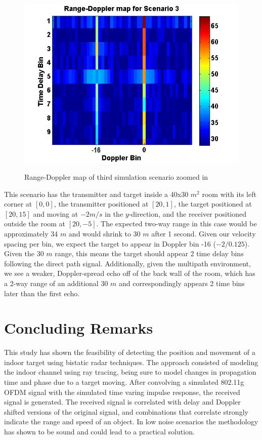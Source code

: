 \documentclass[article,11pt,onecolumn,final]{IEEEtran}
\begin{document}
\begin{figure}[H]
	\caption{Range-Doppler map of third simulation scenario zoomed in}
	\centering
	\includegraphics[width=400pt]{figures/rdm3zoom.png}
	\label{fig:rdm3zoom}
\end{figure}

This scenario has the transmitter and target inside a 40x30 $m^2$ room with its left corner at $[0, 0]$, the transmitter positioned at $[20, 1]$, the target positioned at $[20, 15]$ and moving at $-2 m/s$ in the $y$-direction, and the receiver positioned outside the room at $[20, -5]$. The expected two-way range in this case would be approximately 34 $m$ and would shrink to 30 $m$ after 1 second. Given our velocity spacing per bin, we expect the target to appear in Doppler bin -16 ($-2 / 0.125$). Given the 30 $m$ range, this means the target should appear 2 time delay bins following the direct path signal. Additionally, given the multipath environment, we see a weaker, Doppler-spread echo off of the back wall of the room, which has a 2-way range of an additional 30 $m$ and correspondingly appears 2 time bins later than the first echo.

\section{Concluding Remarks}
This study has shown the feasibility of detecting the position and movement of a indoor target using bistatic
radar techniques. The approach consisted of modeling the indoor channel using ray tracing, being sure to 
model changes in propagation time and phase due to a target moving. After convolving a simulated 802.11g
OFDM signal with the simulated time varing impulse response, the received signal is generated. The received
signal is correlated with delay and Doppler shifted versions of the original signal, and combinations that correlate
strongly indicate the range and speed of an object. In low noise scenarios the methodology has shown
to be sound and could lead to a practical solution.
\end{document}
